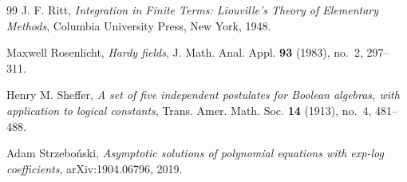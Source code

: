 \documentclass[12pt]{amsart}
\theoremstyle{remark}
\begin{document}
\begin{thebibliography}{99}
J. F. Ritt,
\emph{Integration in Finite Terms: Liouville's Theory of Elementary Methods},
Columbia University Press, New York, 1948.

Maxwell Rosenlicht,
\emph{Hardy fields},
J. Math. Anal. Appl. \textbf{93} (1983), no.~2, 297--311.

Henry M. Sheffer,
\emph{A set of five independent postulates for Boolean algebras, with application to logical constants},
Trans. Amer. Math. Soc. \textbf{14} (1913), no.~4, 481--488.

Adam Strzebo\'nski,
\emph{Asymptotic solutions of polynomial equations with exp-log coefficients},
arXiv:1904.06796, 2019.

\end{thebibliography}
\end{document}
